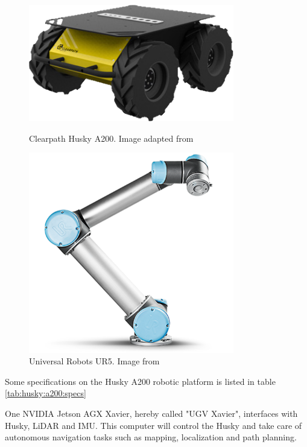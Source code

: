 \begin{figure}[H]
  \centering
  \begin{minipage}[b]{0.49\textwidth}
        \centering
        \includegraphics[width = 0.8\textwidth]{Figures/huskyA200.png}
        \caption{Clearpath Husky A200. Image adapted from \cite{clearpath_husky_website}}
        \label{fig:huskyA200}
  \end{minipage}
  \hfill
  \begin{minipage}[b]{0.49\textwidth}
    \centering
    \includegraphics[width = 0.8\textwidth]{Figures/ur5.png}
    \caption{Universal Robots UR5. Image from \cite{ur5_img}}
    \label{fig:ur5}
  \end{minipage}
\end{figure}

Some specifications on the Husky A200 robotic platform is listed in table \ref{tab:husky:a200:specs}



One NVIDIA Jetson AGX Xavier, hereby called "UGV Xavier", interfaces with Husky, LiDAR and IMU. This computer will control the Husky and take care of autonomous navigation tasks such as mapping, localization and path planning. 

